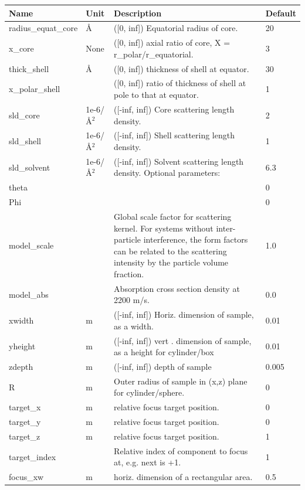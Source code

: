 \begin{longtable}{p{}p{}p{}p{}}
\toprule
\textbf{Name} & \textbf{Unit} & \textbf{Description} & \textbf{Default} \\
\midrule
\endhead
radius\_equat\_core & \AA{} & ([0, inf]) Equatorial radius of core. & 20 \\
x\_core & None & ([0, inf]) axial ratio of core, X = r\_polar/r\_equatorial. & 3 \\
thick\_shell & \AA{} & ([0, inf]) thickness of shell at equator. & 30 \\
x\_polar\_shell &  & ([0, inf]) ratio of thickness of shell at pole to that at equator. & 1 \\
sld\_core & 1e-6/\AA{}$^{2}$ & ([-inf, inf]) Core scattering length density. & 2 \\
sld\_shell & 1e-6/\AA{}$^{2}$ & ([-inf, inf]) Shell scattering length density. & 1 \\
sld\_solvent & 1e-6/\AA{}$^{2}$ & ([-inf, inf]) Solvent scattering length density. Optional parameters: & 6.3 \\
theta &  &  & 0 \\
Phi &  &  & 0 \\
model\_scale &   & Global scale factor for scattering kernel. For systems without inter-particle interference, the form factors can be related to the scattering intensity by the particle volume fraction. & 1.0 \\
model\_abs &   & Absorption cross section density at 2200 m/s. & 0.0 \\
xwidth & m & ([-inf, inf]) Horiz. dimension of sample, as a width. & 0.01 \\
yheight & m & ([-inf, inf]) vert . dimension of sample, as a height for cylinder/box & 0.01 \\
zdepth & m & ([-inf, inf]) depth of sample & 0.005 \\
R & m & Outer radius of sample in (x,z) plane for cylinder/sphere. & 0 \\
target\_x & m & relative focus target position. & 0 \\
target\_y & m & relative focus target position. & 0 \\
target\_z & m & relative focus target position. & 1 \\
target\_index &   & Relative index of component to focus at, e.g. next is +1. & 1 \\
focus\_xw & m & horiz. dimension of a rectangular area. & 0.5 \\

\end{longtable}
